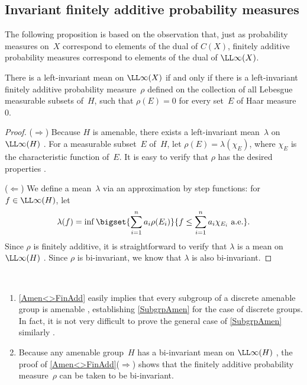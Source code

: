 \subsection{Invariant finitely additive probability measures}

The following proposition is based on the observation that, just as probability measures on~$X$ correspond to elements of the dual of $C(X)$, finitely additive probability measures correspond to elements of the dual of $\LL\infty(X)$.

\begin{prop}[($\ref{AmenEquiv-Mean} \Leftrightarrow \ref{AmenEquiv-FinAdd}$)] \label{Amen<>FinAdd}
There is a left-invariant mean on $\LL\infty(X)$ if and only if there is a left-invariant finitely additive probability measure~$\rho$ defined on the collection of all Lebesgue measurable subsets of~$H$, such that $\rho(E) = 0$ for every set~$E$ of Haar measure~$0$.
\end{prop}

\begin{proof}
($\Rightarrow$) Because $H$ is amenable, there exists a left-invariant mean~$\lambda$ on $\LL\infty(H)$ . For a measurable subset~$E$ of~$H$, let
$\rho(E) = \lambda(\chi_E)$, where $\chi_E$ is the characteristic function of~$E$.
It is easy to verify that $\rho$ has the desired properties .

($\Leftarrow$) We define a mean~$\lambda$ via an approximation by step functions: for $f \in \LL\infty(H)$, let
	$$ \lambda(f) = \inf \bigset{ \sum_{i=1}^n a_i \rho(E_i) }{ 
	f \le  \sum_{i=1}^n a_i \chi_{E_i} \text{ a.e.}
	} .$$
Since $\rho$ is finitely additive, it is straightforward to verify that $\lambda$ is a mean on $\LL\infty(H)$ . Since $\rho$ is bi-invariant, we know that $\lambda$ is also bi-invariant.
\end{proof}

\begin{rem} \label{FinAddRem} \ 
\noprelistbreak
\begin{enumerate}
\item \label{FinAddRem-subgrp}
 \cref{Amen<>FinAdd} easily implies that every subgroup of a discrete amenable group is amenable , establishing \cref{SubgrpAmen} for the case of discrete groups. In fact, it is not very difficult to prove the general case of \cref{SubgrpAmen} similarly .
\item Because any amenable group~$H$ has a bi-invariant mean on $\LL\infty(H)$ \csee{Amen<>MeanLinfty}, the proof of \cref{Amen<>FinAdd}($\Rightarrow$) shows that the finitely additive probability measure~$\rho$ can be taken to be bi-invariant.
\end{enumerate}
\end{rem}





